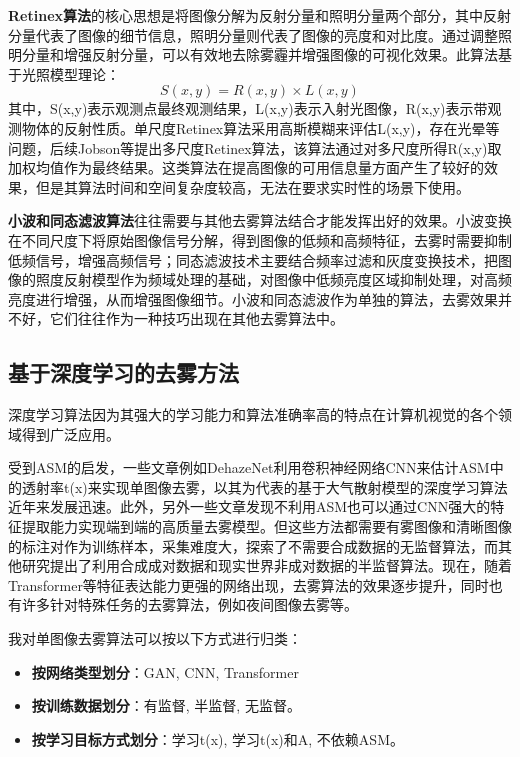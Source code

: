 \documentclass{article}
\begin{document}
\textbf{Retinex算法}\cite{land1965retinex}的核心思想是将图像分解为反射分量和照明分量两个部分，其中反射分量代表了图像的细节信息，照明分量则代表了图像的亮度和对比度。通过调整照明分量和增强反射分量，可以有效地去除雾霾并增强图像的可视化效果。此算法基于光照模型理论：
\begin{equation}
  S(x, y) = R(x, y) \times L(x, y)
  \label{eq:retinex}
\end{equation}
其中，S(x,y)表示观测点最终观测结果，L(x,y)表示入射光图像，R(x,y)表示带观测物体的反射性质。单尺度Retinex算法采用高斯模糊来评估L(x,y)，存在光晕等问题，后续Jobson等提出多尺度Retinex算法\cite{jobson1997properties}，该算法通过对多尺度所得R(x,y)取加权均值作为最终结果。这类算法在提高图像的可用信息量方面产生了较好的效果，但是其算法时间和空间复杂度较高，无法在要求实时性的场景下使用。

\textbf{小波和同态滤波算法}往往需要与其他去雾算法结合才能发挥出好的效果。小波变换在不同尺度下将原始图像信号分解，得到图像的低频和高频特征，去雾时需要抑制低频信号，增强高频信号；同态滤波技术主要结合频率过滤和灰度变换技术，把图像的照度反射模型作为频域处理的基础，对图像中低频亮度区域抑制处理，对高频亮度进行增强，从而增强图像细节。小波和同态滤波作为单独的算法，去雾效果并不好，它们往往作为一种技巧出现在其他去雾算法中\cite{singh2019single,chen2017improved}。

\subsection{基于深度学习的去雾方法}

深度学习算法因为其强大的学习能力和算法准确率高的特点在计算机视觉的各个领域得到广泛应用。

受到ASM的启发，一些文章例如DehazeNet\cite{cai2016dehazenet}利用卷积神经网络CNN来估计ASM中的透射率t(x)来实现单图像去雾，以其为代表的基于大气散射模型的深度学习算法近年来发展迅速。此外，另外一些文章\cite{liang2019selective,liu2019griddehazenet}发现不利用ASM也可以通过CNN强大的特征提取能力实现端到端的高质量去雾模型。但这些方法都需要有雾图像和清晰图像的标注对作为训练样本，采集难度大，\cite{cong2020discrete,li2020zero}探索了不需要合成数据的无监督算法，而其他研究\cite{an2022semi,chen2021psd}提出了利用合成成对数据和现实世界非成对数据的半监督算法。现在，随着Transformer等特征表达能力更强的网络出现，去雾算法的效果逐步提升，同时也有许多针对特殊任务的去雾算法，例如夜间图像去雾等。

我对单图像去雾算法可以按以下方式进行归类：

\begin{itemize}
  \item \textbf{按网络类型划分}：GAN, CNN, Transformer
  
  \item \textbf{按训练数据划分}：有监督, 半监督, 无监督。
  
  \item \textbf{按学习目标方式划分}：学习t(x), 学习t(x)和A, 不依赖ASM。
\end{itemize}
\end{document}
